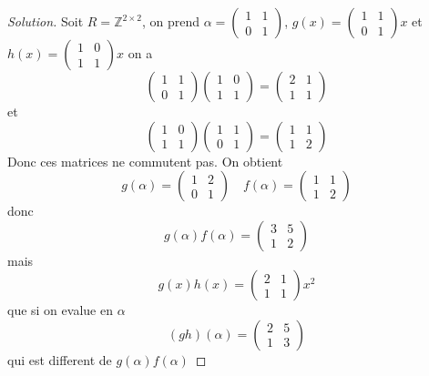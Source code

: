 \documentclass[a4paper,12pt,french]{report}
\theoremstyle{plain}
\theoremstyle{definition}
\begin{document}
\begin{proof}[Solution]
Soit $R=\mathbb{Z}^{2\times2}$, on prend $\alpha=\begin{pmatrix}1 & 1 \\ 0 & 1\end{pmatrix}$, $g(x)=\begin{pmatrix}1 & 1  \\ 0 & 1 \end{pmatrix}x$ et $h(x)=\begin{pmatrix} 1 & 0 \\ 1 & 1\end{pmatrix}x$ on a
$$
\begin{pmatrix}
1 & 1 \\
0 & 1
\end{pmatrix}\begin{pmatrix}
1 & 0 \\
1 & 1
\end{pmatrix}=\begin{pmatrix}
2 & 1 \\
1 & 1
\end{pmatrix}
$$
et 
$$
\begin{pmatrix}
1 & 0 \\
1 & 1
\end{pmatrix}\begin{pmatrix}
1 & 1 \\
0 & 1
\end{pmatrix}=\begin{pmatrix}
1 & 1 \\
1 & 2
\end{pmatrix}
$$
Donc ces matrices ne commutent pas. On obtient
$$
g(\alpha)=\begin{pmatrix}
1 & 2 \\
0 & 1
\end{pmatrix}\quad f(\alpha)=\begin{pmatrix}
1 & 1 \\
1 & 2
\end{pmatrix}
$$
donc
$$
g(\alpha)f(\alpha)=\begin{pmatrix}
3 & 5 \\
1 & 2
\end{pmatrix}
$$
mais
$$
g(x)h(x)=\begin{pmatrix}
2 & 1 \\
1 & 1 
\end{pmatrix}x^{2}
$$
que si on evalue en $\alpha$
$$
(gh)(\alpha)=\begin{pmatrix}
2 & 5 \\
1 & 3
\end{pmatrix}
$$
qui est different de $g(\alpha)f(\alpha)$
\end{proof}
\end{document}
